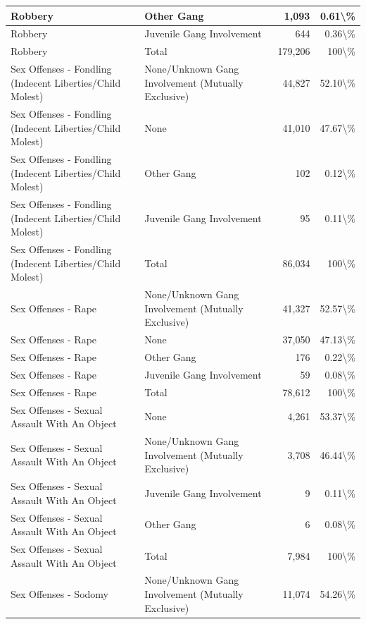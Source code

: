 \documentclass[
]{krantz}
\begin{document}
\begin{longtable}[t]{l|l|r|r}
\hline
Robbery & Other Gang & 1,093 & 0.61\textbackslash{}\%\\
\hline
Robbery & Juvenile Gang Involvement & 644 & 0.36\textbackslash{}\%\\
\hline
Robbery & Total & 179,206 & 100\textbackslash{}\%\\
\hline
Sex Offenses - Fondling (Indecent Liberties/Child Molest) & None/Unknown Gang Involvement (Mutually Exclusive) & 44,827 & 52.10\textbackslash{}\%\\
\hline
Sex Offenses - Fondling (Indecent Liberties/Child Molest) & None & 41,010 & 47.67\textbackslash{}\%\\
\hline
Sex Offenses - Fondling (Indecent Liberties/Child Molest) & Other Gang & 102 & 0.12\textbackslash{}\%\\
\hline
Sex Offenses - Fondling (Indecent Liberties/Child Molest) & Juvenile Gang Involvement & 95 & 0.11\textbackslash{}\%\\
\hline
Sex Offenses - Fondling (Indecent Liberties/Child Molest) & Total & 86,034 & 100\textbackslash{}\%\\
\hline
Sex Offenses - Rape & None/Unknown Gang Involvement (Mutually Exclusive) & 41,327 & 52.57\textbackslash{}\%\\
\hline
Sex Offenses - Rape & None & 37,050 & 47.13\textbackslash{}\%\\
\hline
Sex Offenses - Rape & Other Gang & 176 & 0.22\textbackslash{}\%\\
\hline
Sex Offenses - Rape & Juvenile Gang Involvement & 59 & 0.08\textbackslash{}\%\\
\hline
Sex Offenses - Rape & Total & 78,612 & 100\textbackslash{}\%\\
\hline
Sex Offenses - Sexual Assault With An Object & None & 4,261 & 53.37\textbackslash{}\%\\
\hline
Sex Offenses - Sexual Assault With An Object & None/Unknown Gang Involvement (Mutually Exclusive) & 3,708 & 46.44\textbackslash{}\%\\
\hline
Sex Offenses - Sexual Assault With An Object & Juvenile Gang Involvement & 9 & 0.11\textbackslash{}\%\\
\hline
Sex Offenses - Sexual Assault With An Object & Other Gang & 6 & 0.08\textbackslash{}\%\\
\hline
Sex Offenses - Sexual Assault With An Object & Total & 7,984 & 100\textbackslash{}\%\\
\hline
Sex Offenses - Sodomy & None/Unknown Gang Involvement (Mutually Exclusive) & 11,074 & 54.26\textbackslash{}\%\\

\end{longtable}
\end{document}
